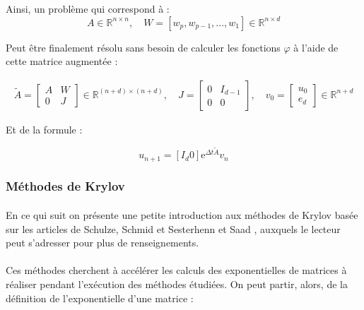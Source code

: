 Ainsi, un problème qui correspond à :
\begin{equation}
    A \in \mathbb{R}^{n \times n}, \quad W=\left[w_{p}, w_{p-1}, \ldots, w_{1}\right] \in \mathbb{R}^{n \times d}
\end{equation}

Peut être finalement résolu sans besoin de calculer les fonctions $\varphi$ à l'aide de cette matrice augmentée :

\begin{equation} 
    \begin{array}{l}{\widetilde{A}=\left[ \begin{array}{cc}{A} & {W} \\ {0} & {J}\end{array}\right] \in \mathbb{R}^{(n+d) \times(n+d)}, \quad J=\left[ \begin{array}{cc}{0} & {I_{d-1}} \\ {0} & {0}\end{array}\right], \quad v_{0}=\left[ \begin{array}{c}{u_{0}} \\ {e_{d}}\end{array}\right] \in \mathbb{R}^{n+d}}\end{array}
\end{equation}

Et de la formule :

\begin{equation} 
    u_{n+1}=\left[I_{d} 0\right] \mathrm{e}^{\Delta t \widetilde{A}} v_{n}
\end{equation} 

\subsubsection{Méthodes de Krylov}

\paragraph{}
En ce qui suit on présente une petite introduction aux méthodes de Krylov basée sur les articles de Schulze, Schmid et Sesterhenn \cite{Krylov:1} et Saad \cite{Krylov:2}, auxquels le lecteur peut s'adresser pour plus de renseignements.

\paragraph{}
Ces méthodes cherchent à accélérer les calculs des exponentielles de matrices à réaliser pendant l'exécution des méthodes étudiées. On peut partir, alors, de la définition de l'exponentielle d'une matrice :%

